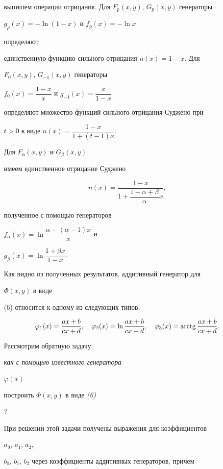 выпишем операции отрицания. Для $F_p(x,y)$, $G_p(x,y)$ генераторы


$g_p(x)=-\ln(1-x)$ и $f_p(x)=-\ln x$


определяют


единственную функцию сильного отрицания $n(x)=1-x$. Для


$F_0(x,y)$, $G_{-1}(x,y)$ генераторы


$f_0(x)=\dfrac{1-x}{x}$ и $g_{-1}(x)=\dfrac{x}{1-x}$


определяют множество функций сильного отрицания Суджено при


$t>0$ в виде $n(x)=\dfrac{1-x}{1+(t-1)x}$.


Для $F_\alpha(x,y)$ и $G_\beta(x,y)$


имеем единственное отрицание Суджено


$$


n(x)=\frac{1-x}{1+\dfrac{1-\alpha+\beta}{\alpha}x},


$$


полученное с помощью генераторов


$f_\alpha(x)=\ln\dfrac{\alpha-(\alpha-1)x}{x}$ и


$g_\beta(x)=\ln\dfrac{1+\beta x}{1-x}$.





Как видно из полученных результатов, аддитивный генератор для


$\Phi(x,y)$ в виде


(6) относится к одному из следующих типов:


$$


\varphi_1(x)=\frac{ax+b}{cx+d},\quad


\varphi_2(x)=\ln\frac{ax+b}{cx+d},\quad


\varphi_3(x)=\arctg\frac{ax+b}{cx+d}.


$$





Рассмотрим обратную задачу: {\it как с помощью известного генератора


$\varphi(x)$


построить $\Phi(x,y)$ в виде {\em (6)}}?





При решении этой задачи получены выражения для коэффициентов


$a_0$, $a_1$, $a_2$,


$b_0$, $b_1$, $b_2$ через коэффициенты аддитивных генераторов, причем





